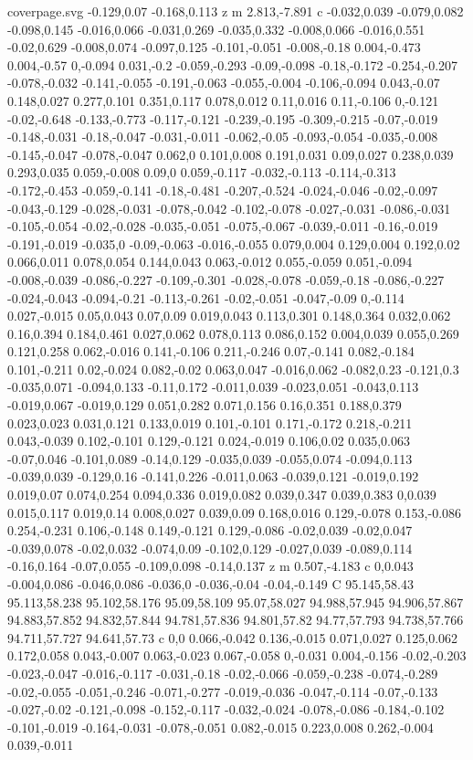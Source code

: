 \begin{filecontents}[noheader]{coverpage.svg}
-0.129,0.07 -0.168,0.113 z m 2.813,-7.891 c -0.032,0.039 -0.079,0.082 -0.098,0.145 -0.016,0.066 -0.031,0.269 -0.035,0.332 -0.008,0.066 -0.016,0.551 -0.02,0.629 -0.008,0.074 -0.097,0.125 -0.101,-0.051 -0.008,-0.18 0.004,-0.473 0.004,-0.57 0,-0.094 0.031,-0.2 -0.059,-0.293 -0.09,-0.098 -0.18,-0.172 -0.254,-0.207 -0.078,-0.032 -0.141,-0.055 -0.191,-0.063 -0.055,-0.004 -0.106,-0.094 0.043,-0.07 0.148,0.027 0.277,0.101 0.351,0.117 0.078,0.012 0.11,0.016 0.11,-0.106 0,-0.121 -0.02,-0.648 -0.133,-0.773 -0.117,-0.121 -0.239,-0.195 -0.309,-0.215 -0.07,-0.019 -0.148,-0.031 -0.18,-0.047 -0.031,-0.011 -0.062,-0.05 -0.093,-0.054 -0.035,-0.008 -0.145,-0.047 -0.078,-0.047 0.062,0 0.101,0.008 0.191,0.031 0.09,0.027 0.238,0.039 0.293,0.035 0.059,-0.008 0.09,0 0.059,-0.117 -0.032,-0.113 -0.114,-0.313 -0.172,-0.453 -0.059,-0.141 -0.18,-0.481 -0.207,-0.524 -0.024,-0.046 -0.02,-0.097 -0.043,-0.129 -0.028,-0.031 -0.078,-0.042 -0.102,-0.078 -0.027,-0.031 -0.086,-0.031 -0.105,-0.054 -0.02,-0.028 -0.035,-0.051 -0.075,-0.067 -0.039,-0.011 -0.16,-0.019 -0.191,-0.019 -0.035,0 -0.09,-0.063 -0.016,-0.055 0.079,0.004 0.129,0.004 0.192,0.02 0.066,0.011 0.078,0.054 0.144,0.043 0.063,-0.012 0.055,-0.059 0.051,-0.094 -0.008,-0.039 -0.086,-0.227 -0.109,-0.301 -0.028,-0.078 -0.059,-0.18 -0.086,-0.227 -0.024,-0.043 -0.094,-0.21 -0.113,-0.261 -0.02,-0.051 -0.047,-0.09 0,-0.114 0.027,-0.015 0.05,0.043 0.07,0.09 0.019,0.043 0.113,0.301 0.148,0.364 0.032,0.062 0.16,0.394 0.184,0.461 0.027,0.062 0.078,0.113 0.086,0.152 0.004,0.039 0.055,0.269 0.121,0.258 0.062,-0.016 0.141,-0.106 0.211,-0.246 0.07,-0.141 0.082,-0.184 0.101,-0.211 0.02,-0.024 0.082,-0.02 0.063,0.047 -0.016,0.062 -0.082,0.23 -0.121,0.3 -0.035,0.071 -0.094,0.133 -0.11,0.172 -0.011,0.039 -0.023,0.051 -0.043,0.113 -0.019,0.067 -0.019,0.129 0.051,0.282 0.071,0.156 0.16,0.351 0.188,0.379 0.023,0.023 0.031,0.121 0.133,0.019 0.101,-0.101 0.171,-0.172 0.218,-0.211 0.043,-0.039 0.102,-0.101 0.129,-0.121 0.024,-0.019 0.106,0.02 0.035,0.063 -0.07,0.046 -0.101,0.089 -0.14,0.129 -0.035,0.039 -0.055,0.074 -0.094,0.113 -0.039,0.039 -0.129,0.16 -0.141,0.226 -0.011,0.063 -0.039,0.121 -0.019,0.192 0.019,0.07 0.074,0.254 0.094,0.336 0.019,0.082 0.039,0.347 0.039,0.383 0,0.039 0.015,0.117 0.019,0.14 0.008,0.027 0.039,0.09 0.168,0.016 0.129,-0.078 0.153,-0.086 0.254,-0.231 0.106,-0.148 0.149,-0.121 0.129,-0.086 -0.02,0.039 -0.02,0.047 -0.039,0.078 -0.02,0.032 -0.074,0.09 -0.102,0.129 -0.027,0.039 -0.089,0.114 -0.16,0.164 -0.07,0.055 -0.109,0.098 -0.14,0.137 z m 0.507,-4.183 c 0,0.043 -0.004,0.086 -0.046,0.086 -0.036,0 -0.036,-0.04 -0.04,-0.149 C 95.145,58.43 95.113,58.238 95.102,58.176 95.09,58.109 95.07,58.027 94.988,57.945 94.906,57.867 94.883,57.852 94.832,57.844 94.781,57.836 94.801,57.82 94.77,57.793 94.738,57.766 94.711,57.727 94.641,57.73 c 0,0 0.066,-0.042 0.136,-0.015 0.071,0.027 0.125,0.062 0.172,0.058 0.043,-0.007 0.063,-0.023 0.067,-0.058 0,-0.031 0.004,-0.156 -0.02,-0.203 -0.023,-0.047 -0.016,-0.117 -0.031,-0.18 -0.02,-0.066 -0.059,-0.238 -0.074,-0.289 -0.02,-0.055 -0.051,-0.246 -0.071,-0.277 -0.019,-0.036 -0.047,-0.114 -0.07,-0.133 -0.027,-0.02 -0.121,-0.098 -0.152,-0.117 -0.032,-0.024 -0.078,-0.086 -0.184,-0.102 -0.101,-0.019 -0.164,-0.031 -0.078,-0.051 0.082,-0.015 0.223,0.008 0.262,-0.004 0.039,-0.011 
\end{filecontents}
